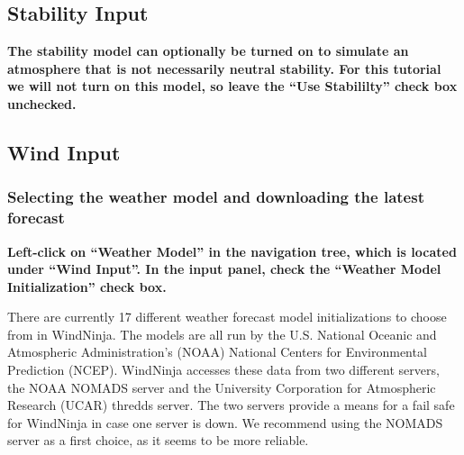 \documentclass[12pt]{article}
\begin{document}
\subsection{Stability Input}

\textbf{\color{red} The stability model can optionally be turned on to simulate an atmosphere that is not necessarily neutral stability.  For this tutorial we will not turn on this model, so leave the “Use Stabililty” check box unchecked.}

\subsection{Wind Input}

\subsubsection{Selecting the weather model and downloading the latest forecast}

\textbf{\color{red} Left-click on “Weather Model” in the navigation tree, which is located under  “Wind Input”.  In the input panel, check the “Weather Model Initialization” check box.}

There are currently 17 different weather forecast model initializations to choose from in WindNinja.  The models are all run by the U.S. National Oceanic and Atmospheric Administration's (NOAA) National Centers for Environmental Prediction (NCEP).  WindNinja accesses these data from two different servers, the NOAA NOMADS server and the University Corporation for Atmospheric Research (UCAR) thredds server.  The two servers provide a means for a fail safe for WindNinja in case one server is down.  We recommend using the NOMADS server as a first choice, as it seems to be more reliable.
\end{document}
